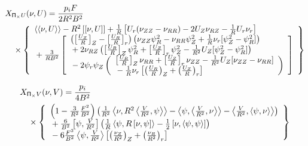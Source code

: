 \documentclass[letterpaper]{book}
\newcommand{\tensor}[1]{\mathsf{#1}}
\renewcommand{\P}{\tensor{\Pi}}
\newcommand{\pb}[2]{\left[#1,#2\right]}
\newcommand{\ip}[2]{\left\langle  #1,#2\right\rangle}
\newcommand{\funcss}[2]{
  \left\langle\left\langle #1,#2 \right\rangle\right\rangle}
\newcommand{\funcaa}[2]{\left[\left[ #1,#2 \right]\right]}
\begin{document}
\begin{eqnarray*}
  & \lefteqn{X_{\P_\times U}(\nu, U) = \frac{p_i F}{2 R^2 B^2}} &
  \\ && \mbox{} \times  
  \left\{ \begin{array}{l}
  \funcss{\nu}{U} - R^2 \funcaa{\nu}{U} 
  + \frac{1}{R} \left[ U_r (\nu_{Z Z} - \nu_{R R})
                     -2 U_Z \nu_{R Z} - \frac{1}{R} U_r \nu_r \right]
  \\ \mbox{}
  + \frac{3}{R B^2} \left[ \begin{array}{l}
    \left( \left[\frac{U_Z}{R} \right]_Z 
         - \left[\frac{U_R}{R} \right]_r \right)
    \left(\nu_{Z Z} \psi_R^2 - \nu_{R R} \psi_Z^2
         +\frac{1}{R} \nu_r [\psi_Z^2 - \psi_R^2] \right)
    \\ \mbox{}
    + 2\nu_{R Z} \left( 
        \left[ \frac{U_R}{R} \right]_Z \psi_R^2
      + \left[ \frac{U_Z}{R} \right]_r \psi_Z^2
      - \frac{1}{R^2} U_Z [\psi_Z^2 - \psi_R^2] \right)
    \\ \mbox{}
    - 2 \psi_r \psi_Z \left( \begin{array}{l}
        \left[ \frac{U_R}{R} \right]_Z \nu_{R R}
      + \left[ \frac{U_Z}{R} \right]_r \nu_{Z Z}
      - \frac{1}{R^2} U_Z [\nu_{Z Z} - \nu_{R R}] 
      \\ \mbox{}
      - \frac{1}{R} \nu_r \left[ 
	  \left( \frac{U_R}{R} \right)_Z
	+ \left( \frac{U_Z}{R} \right)_r \right] 
      \end{array} \right)
    \end{array} \right]
  \end{array} \right\}
\end{eqnarray*}

\begin{eqnarray*}
  & \lefteqn{X_{\P_\times V}(\nu, V) = \frac{p_i}{4 B^2}} &
  \\ && \mbox{} \times 
  \left\{ \begin{array}{l}
    \left(1 - \frac{3}{R^2} \frac{F^2}{B^2} \right) \left(
    \frac{1}{R^2} \ip{\nu}{R^2\ip{\frac{V}{R^2}}{\psi}}
    - \ip{\psi}{\ip{\frac{V}{R^2}}{\nu}}
    - \ip{\frac{V}{R^2}}{\ip{\psi}{\nu}} \right)
    \\ \mbox{} + \frac{6}{B^2} \pb{\psi}{\frac{V}{R^2}}
    \left(\frac{1}{R} \ip{\psi}{R \pb{\nu}{\psi}}
    - \frac{1}{2} \pb{\nu}{\ip{\psi}{\psi}} \right)
    \\ \mbox{} - 6 \frac{F^2}{B^2} \ip{\psi}{\frac{V}{R^2}}
    \left[ \left(\frac{\nu_Z}{R^2} \right)_Z
         + \left(\frac{\nu_R}{R^2} \right)_r \right]
  \end{array} \right\}
\end{eqnarray*}
\end{document}
